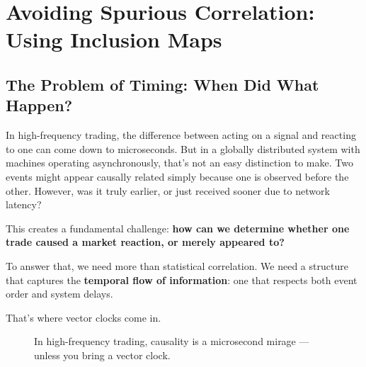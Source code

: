 \section{Avoiding Spurious Correlation: Using Inclusion Maps}

\subsection{The Problem of Timing: When Did What Happen?}

\vspace{0.5em}
In high-frequency trading, the difference between acting on a signal and reacting to one can come down to microseconds. But in a globally distributed system with machines operating asynchronously, that’s not an easy distinction to make. Two events might appear causally related simply because one is observed before the other. However, was it truly earlier, or just received sooner due to network latency?

This creates a fundamental challenge: \textbf{how can we determine whether one trade caused a market reaction, or merely appeared to?}

To answer that, we need more than statistical correlation. We need a structure that captures the \textbf{temporal flow of information}: one that respects both event order and system delays.

That’s where vector clocks come in.


\begin{figure}[H]
\centering
{}
\caption{In high-frequency trading, causality is a microsecond mirage — unless you bring a vector clock.}
\end{figure}



